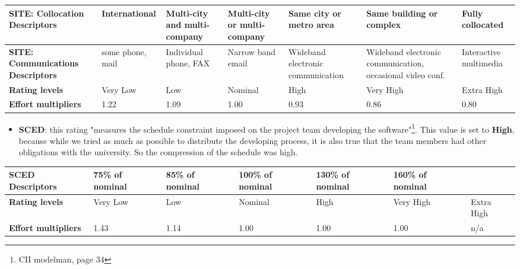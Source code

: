 		\begin{center}
			\begin{tabular}{ | C{2cm} | C{2cm} | C{2cm} | C{2cm} | C{2cm} | C{2cm} | C{2cm} | }
				\hline
				\textbf{SITE: Collocation Descriptors} & International & Multi-city and multi-company & Multi-city or multi-company & Same city or metro area & Same building or complex & Fully collocated \\ \hline
				
				\textbf{SITE: Communications Descriptors} & some phone, mail & Individual phone, FAX & Narrow band email & Wideband electronic communication & Wideband electronic communication, occasional video conf. & Interactive multimedia\\ \hline
			
				\textbf{Rating levels} & Very Low & Low & Nominal & High & Very High & Extra High\\ \hline
			
				\textbf{Effort multipliers} & 1.22 & 1.09 & 1.00 & 0.93 & 0.86 & 0.80\\ \hline
			\end{tabular}
		\end{center}
		
		

		
		\begin{itemize}
			\item \textbf{SCED}: this rating "measures the schedule constraint imposed on the project team developing the
software"\footnote{CII modelman, page 34}. This value is set to \textbf{High}, because while we tried as much as possible to distribute the developing process, it is also true that the team members had other obligations with the university. So the compression of the schedule was high.
		\end{itemize}
		
		\begin{center}
			\begin{tabular}{ | C{2cm} | C{2cm} | C{2cm} | C{2cm} | C{2cm} | C{2cm} | C{2cm} | }
				\hline
				\textbf{SCED Descriptors} & 75\% of nominal & 85\% of nominal & 100\% of nominal & 130\% of nominal & 160\% of nominal & \\ \hline
				
				\textbf{Rating levels} & Very Low & Low & Nominal & High & Very High & Extra High\\ \hline
			
				\textbf{Effort multipliers} & 1.43 & 1.14 & 1.00 & 1.00 & 1.00 & n/a\\ \hline
			\end{tabular}
		\end{center}
		
